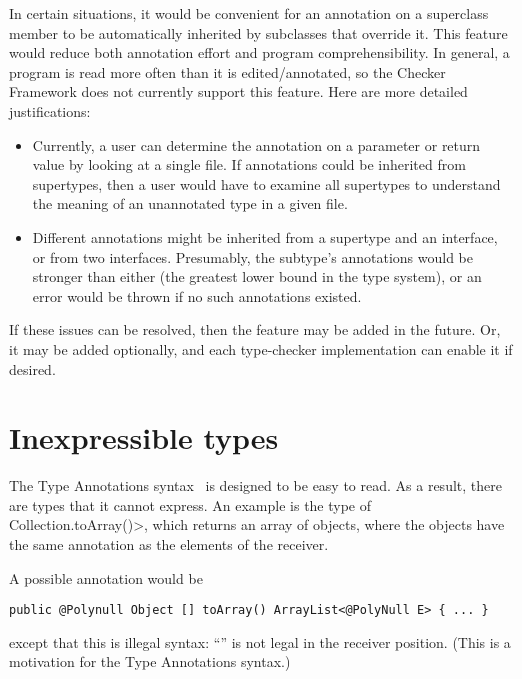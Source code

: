 In certain situations, it would be convenient for an annotation on a
superclass member to be automatically inherited by subclasses that override
it.  This feature would reduce both annotation effort and program
comprehensibility.  In general, a program is read more often than it is
edited/annotated, so the Checker Framework does not currently support this
feature.  Here are more detailed justifications:

\begin{itemize}

\item
  Currently, a user can determine the annotation on a parameter or return
  value by looking at a single file.  If annotations could be inherited
  from supertypes, then a user would have to examine all supertypes to
  understand the meaning of an unannotated type in a given file.

\item
  Different annotations might be inherited from a supertype and an
  interface, or from two interfaces.  Presumably, the subtype's annotations
  would be stronger than either (the greatest lower bound in the type
  system), or an error would be thrown if no such annotations existed.

\end{itemize}

If these issues can be resolved, then the feature may be added in the
future.  Or, it may be added optionally, and each type-checker
implementation can enable it if desired.


\section{Inexpressible types\label{inexpressible-types}}

The Type Annotations syntax~\cite{jsr308} is designed to be easy to read.  As a result,
there are types that it cannot express.  An example is the type of
\<Collection.toArray()>, which returns an array of objects, where the
objects have the same annotation as the elements of the receiver.

A possible annotation would be

\begin{Verbatim}
public @Polynull Object [] toArray() ArrayList<@PolyNull E> { ... }
\end{Verbatim}

\noindent
except that this is illegal syntax:  ``'' is
not legal in the receiver position.  (This is a motivation for
the Type Annotations syntax.)

